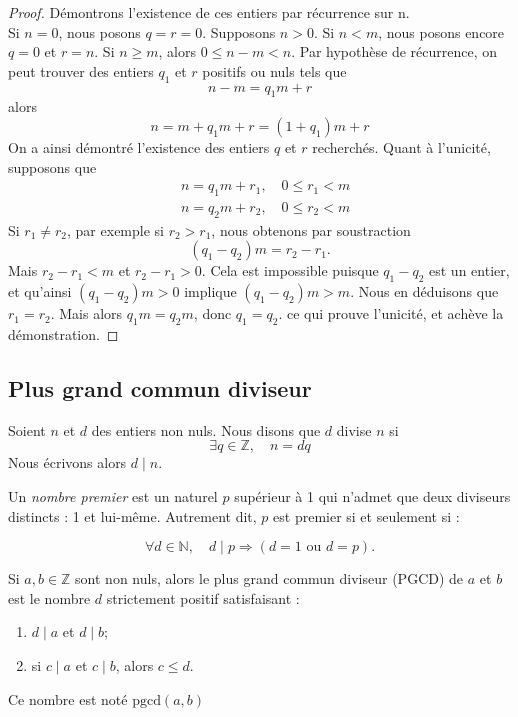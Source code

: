 \begin{proof}
    Démontrons l'existence de ces entiers par récurrence sur n.
    \\ Si $n=0$, nous posons $q=r=0. $ Supposons $n>0$. Si $n<m$, nous posons encore $q=0$ et $r=n$. Si $n\geq m$, alors $0\leq n-m<n$. Par hypothèse de récurrence, on peut trouver des entiers $q_1$ et $r$ positifs ou nuls tels que
    \[
    n-m=q_1m+r
    \]
    alors \[
    n=m+q_1m+r=(1+q_1)m +r
    \]
    On a ainsi démontré l'existence des entiers $q$ et $r$ recherchés. Quant à l'unicité, supposons que
    \begin{align*}
        &n=q_1m+r_1, \quad 0\leq r_1<m\\
        &n=q_2m+r_2, \quad 0\leq r_2<m
    \end{align*}
    Si $r_1\neq r_2$, par exemple si $r_2>r_1$, nous obtenons par soustraction
    \[
    (q_1-q_2)m= r_2-r_1.
    \]
    Mais $r_2-r_1<m$ et $r_2-r_1>0$. Cela est impossible puisque $q_1-q_2$ est un entier, et qu'ainsi $(q_1-q_2)m>0$ implique $(q_1-q_2)m>m$. Nous en déduisons que $r_1=r_2$. Mais alors $q_1m=q_2m$, donc $q_1=q_2$. ce qui prouve l'unicité, et achève la démonstration.
\end{proof}
\subsection{Plus grand commun diviseur}

\begin{definition}
    Soient $n$ et $d$ des entiers non nuls. Nous disons que $d$ divise $n$ si
    \[
    \exists q\in \mathbb{Z}, \quad n=dq
    \]
    Nous écrivons alors $d\mid n$.
\end{definition}
\begin{definition}
    Un \textit{nombre premier} est un naturel \( p \) supérieur à 1 qui n'admet que deux diviseurs distincts : 1 et lui-même. Autrement dit, \( p \) est premier si et seulement si :  

\[
\forall d \in \mathbb{N}, \quad d \mid p \Rightarrow (d = 1 \text{ ou } d = p).
\]
\end{definition}

\begin{definition}
   Si $a,b\in \mathbb{Z}$ sont non nuls, alors  le plus grand commun diviseur (PGCD) de $a$ et $b$ est le nombre $d$ strictement positif satisfaisant :
   \begin{enumerate}
       \item $d\mid a$ et $d\mid b$;
       \item si $c\mid a$ et $c\mid b$, alors $c\leq d$.
   \end{enumerate}
   Ce nombre est noté $\text{pgcd}(a,b)$
\end{definition}

